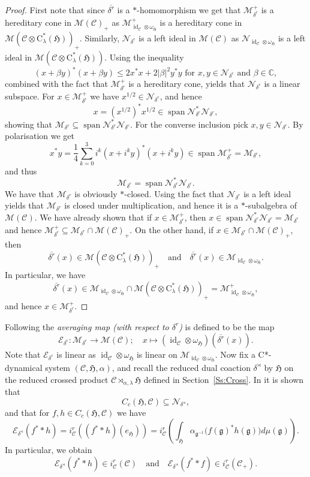 \documentclass[11pt,final]{amsart}
\numberwithin{equation}{section}
\theoremstyle{plain}
\theoremstyle{definition}
\theoremstyle{remark}
\newcommand{\C}{{\mathcal{C}}}
\newcommand{\E}{{\mathcal{E}}}
\newcommand{\M}{{\mathcal{M}}}
\newcommand{\N}{{\mathcal{N}}}
\def\al{\alpha}
\def\be{\beta}
\def\de{\delta}
\def\la{\lambda}
\def\om{\omega}
\newcommand{\bC}{\mathbb{C}}
\newcommand{\fg}{{\mathfrak{g}}}
\newcommand{\fH}{{\mathfrak{H}}}
\newcommand{\qand}{\quad\text{and}\quad}
\newcommand{\ca}{\mathrm{C}^*}
\newcommand{\ol}{\overline}
\newcommand{\id}{{\operatorname{id}}}
\newcommand{\spn}{\operatorname{span}}
\begin{document}
\begin{proof}
First note that since $\ol{\de^r}$ is a $*$-homomorphism we get that  $\M_{\de^r}^+$ is a hereditary cone in $\M(\C)_+$ as $\M_{\id_{\C}\otimes \om_{\fH}}^+$ is a hereditary cone in $\M(\C\otimes \ca_\la(\fH))_+$. Similarly, $\N_{\de^r}$ is a left ideal in $\M(\C)$ as $\N_{\id_{\C}\otimes \om_{\fH}}$ is a left ideal in $\M(\C\otimes \ca_\la(\fH))$. Using the inequality
\[
(x+ \be y)^* (x+\be y) \leq 2 x^* x+ 2 |\be|^2 y^*y \text{ for } x,y\in \N_{\de^r} \text{ and }\be \in \bC,
\]
combined with the fact that $\M_{\de^r}^+$ is a hereditary cone, yields that $\N_{\de^r}$ is a linear subspace. For $x \in \M_{\de^r}^+$ we have $x^{1/2}\in \N_{\de^r}$, and hence 
\[
x=(x^{1/2})^* x^{1/2} \in \spn\N_{\de^r}^* \N_{\de^r},
\]
showing that $\M_{\de^r} \subseteq \spn \N_{\de^r}^*\N_{\de^r}$. For the converse inclusion pick $x,y\in \N_{\de^r}$. By polarisation we get
\[
x^*y=\frac{1}{4} \sum_{k=0}^3 i^{k}(x+i^k y)^*(x+i^k y) \in \spn \M_{\de^r}^+=\M_{\de^r},
\]
and thus
\[
\M_{\de^r}=\spn \N_{\de^r}^* \N_{\de^r}.
\]
We have that $\M_{\de^r}$ is obviously $*$-closed. Using the fact that $\N_{\de^r}$ is a left ideal yields that $\M_{\de^r}$ is closed under multiplication, and hence it is a $*$-subalgebra of $\M(\C)$. 
We have already shown that if $x \in \M_{\de^r}^+$, then $x\in \spn \N_{\de^r}^*\N_{\de^r}= \M_{\de^r}$ and hence $\M_{\de^r}^+\subseteq \M_{\de^r}\cap \M(\C)_+$. On the other hand, if $x \in \M_{\de^r}\cap \M(\C)_+$, then 
\[
\ol{\de^r}(x) \in \M(\C\otimes \ca_\la(\fH))_+ \qand \ol{\de^r}(x)
\in
\M_{\id_{\C}\otimes \om_{\fH}}. 
\]
In particular, we have
\[
\ol{\de^r}(x)
\in
\M_{\id_{\C}\otimes \om_{\fH}}
\cap
\M(\C\otimes \ca_\la(\fH))_+
=
\M_{\id_{\C}\otimes \om_{\fH}}^+,
\]
and hence $x\in \M_{\de^r}^+$.
\end{proof}

Following \cite[Section~3.2]{Bus10} the \emph{averaging map (with respect to $\de^r$)} is defined to be the map
\[
\E_{\de^r}\colon \M_{\de^r} \to \M(\C); \quad x \mapsto (\id_{\C}\otimes \om_{\fH})(\ol{\de^r}(x)).
\]
Note that $\E_{\de^r}$ is linear as $\id_\C\otimes\om_{\fH}$ is linear on $\M_{\id_\C\otimes\om_{\fH}}$.
Now fix a C*-dynamical system $(\C,\fH,\al)$, and recall the reduced dual coaction $\de^\rtimes$ by $\fH$ on the reduced crossed product $\C\rtimes_{\al,\la} \fH$ defined in Section~\ref{Ss:Cross}.
In \cite[Corollary 3.12]{Bus10} it is shown that
\begin{equation}\label{Eq:Buss}
C_c(\fH,\C)\subseteq\N_{\de^{\rtimes}},
\end{equation}
and that for $f,h \in C_c(\fH, \C)$ we have
\begin{equation}\label{Eq:avercomp}
\E_{\de^{\rtimes}}(f^* \ast h)= i_\C^r\left((f^*\ast h)(e_{\fH})\right)= i_\C^r\left(
\int_{\fH}
\al_{\fg^{-1}}\big(f(\fg)^*h(\fg)\big) d\mu(\fg)\right).
\end{equation}
In particular, we obtain
\[
\E_{\de^{\rtimes}}(f^* \ast h) \in i_\C^r(\C) \qand \E_{\de^{\rtimes}}(f^* \ast f)\in i_\C^r(\C_+).
\]
\end{document}
